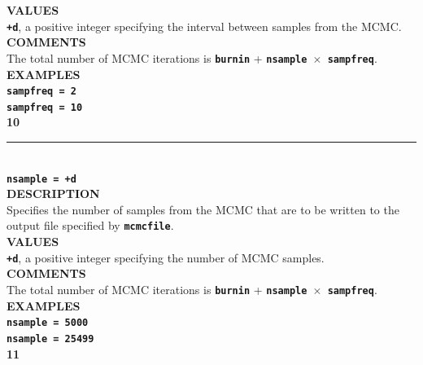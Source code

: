 \documentclass[a4paper]{book}
\numberwithin{equation}{section} \renewcommand{\baselinestretch}{0.55}
\begin{document}
\textbf{VALUES} \vspace{5pt}\\
\textbf{\texttt{+d}}, a positive integer specifying the interval between samples from the MCMC. \vspace{5pt}\\
\textbf{COMMENTS} \vspace{5pt}\\
The total number of MCMC iterations is \textbf{\texttt{burnin}} + \textbf{\texttt{nsample $\times$ sampfreq}}. \vspace{5pt}\\
\textbf{EXAMPLES} \vspace{5pt}\\
\textbf{\texttt{sampfreq = 2}} \vspace{5pt}\\
\textbf{\texttt{sampfreq = 10}}\vspace{10pt}\\
\textbf{{\large 10}} \\
\noindent\rule{\textwidth}{0.8pt} \\
\textbf{{\Large \texttt{nsample = +d}}} \vspace{5pt}\\
\textbf{DESCRIPTION} \vspace{5pt}\\
Specifies the number of samples from the MCMC that are to be written to the output file specified by \textbf{\texttt{mcmcfile}}. \vspace{5pt}\\
\textbf{VALUES} \vspace{5pt}\\
\textbf{\texttt{+d}}, a positive integer specifying the number of MCMC samples. \vspace{5pt}\\
\textbf{COMMENTS} \vspace{5pt}\\
The total number of MCMC iterations is \textbf{\texttt{burnin}} + \textbf{\texttt{nsample $\times$ sampfreq}}. \vspace{5pt}\\
\textbf{EXAMPLES} \vspace{5pt}\\
\textbf{\texttt{nsample = 5000}} \vspace{5pt}\\
\textbf{\texttt{nsample = 25499}}\vspace{10pt}\\
\textbf{{\large 11}} \\
\end{document}

